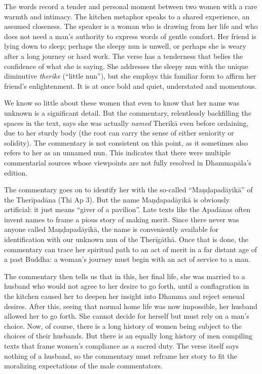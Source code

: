 \documentclass[12pt,openany]{book}%
\begin{document}
The words record a tender and personal moment between two women with a rare warmth and intimacy. The kitchen metaphor speaks to a shared experience, an assumed closeness. The speaker is a woman who is drawing from her life and who does not need a man’s authority to express words of gentle comfort. Her friend is lying down to sleep; perhaps the sleepy nun is unwell, or perhaps she is weary after a long journey or hard work. The verse has a tenderness that belies the confidence of what she is saying. She addresses the sleepy nun with the unique diminutive \textit{therike} (“little nun”), but she employs this familiar form to affirm her friend’s enlightenment. It is at once bold and quiet, understated and momentous.

We know so little about these women that even to know that her name was unknown is a significant detail. But the commentary, relentlessly backfilling the spaces in the text, says she was actually \emph{named} \textsanskrit{Therikā} even before ordaining, due to her sturdy body (the root can carry the sense of either seniority or solidity). The commentary is not consistent on this point, as it sometimes also refers to her as an unnamed nun. This indicates that there were multiple commentarial sources whose viewpoints are not fully resolved in \textsanskrit{Dhammapāla}’s edition.

The commentary goes on to identify her with the so-called “\textsanskrit{Maṇḍapadāyikā}” of the \textsanskrit{Therīpadāna} (Thi Ap 3). But the name \textsanskrit{Maṇḍapadāyikā} is obviously artificial: it just means “giver of a pavilion”. Late texts like the \textsanskrit{Apadānas} often invent names to frame a pious story of making merit. Since there never was anyone called \textsanskrit{Maṇḍapadāyikā}, the name is conveniently available for identification with our unknown nun of the \textsanskrit{Therīgāthā}. Once that is done, the commentary can trace her spiritual path to an act of merit in a far distant age of a past Buddha: a woman’s journey must begin with an act of service to a man.

The commentary then tells us that in this, her final life, she was married to a husband who would not agree to her desire to go forth, until a conflagration in the kitchen caused her to deepen her insight into Dhamma and reject sensual desires. After this, seeing that normal home life was now impossible, her husband allowed her to go forth. She cannot decide for herself but must rely on a man’s choice. Now, of course, there is a long history of women being subject to the choices of their husbands. But there is an equally long history of men compiling texts that frame women’s compliance as a sacred duty. The verse itself says nothing of a husband, so the commentary must reframe her story to fit the moralizing expectations of the male commentators.
\end{document}
